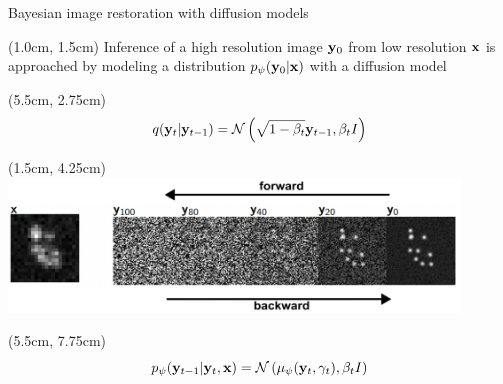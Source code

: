 \documentclass{beamer}					%
\begin{document}
\begin{frame}{Bayesian image restoration with diffusion models}

\begin{textblock*}{13cm}(1.0cm, 1.5cm)
Inference of a high resolution image $\bold{y}_0$ from low resolution $\bold{x}$ is approached by modeling a distribution $p_{\psi}(\bold{y}_0\lvert \bold{x})$ with a diffusion model
\end{textblock*}

\begin{textblock*}{2cm}(5.5cm, 2.75cm)
\begin{equation*}
q(\bold{y}_{t}|\bold{y}_{t-1}) = \mathcal{N}\left(\sqrt{1-\beta_{t}}\bold{y}_{t-1},\beta_t I\right)
\end{equation*}
\end{textblock*}

\begin{textblock*}{12cm}(1.5cm, 4.25cm)
\includegraphics[width=12cm]{../../ddpm/ddpm/media/ForwardBackward.png}
\end{textblock*}

\begin{textblock*}{2cm}(5.5cm, 7.75cm)
\begin{equation*}
p_{\psi}(\bold{y}_{t-1}|\bold{y}_{t},\bold{x}) = \mathcal{N}\left(\mu_{\psi}(\bold{y}_{t},\gamma_{t}),\beta_{t}I\right)
\end{equation*}

\end{textblock*}

\end{frame}
\end{document}
